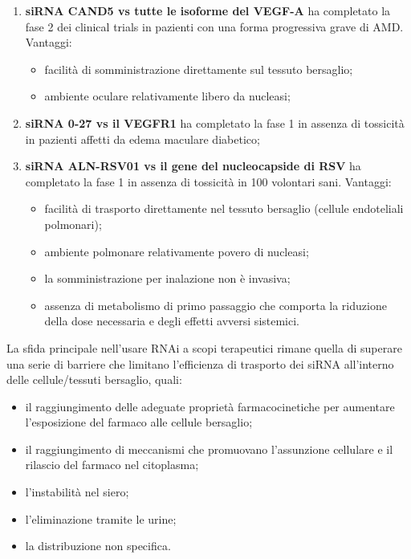 \documentclass[11pt]{book}
\begin{document}
\begin{enumerate}
\def\labelenumi{\arabic{enumi}.}
\item
  \textbf{siRNA CAND5 vs tutte le isoforme del VEGF-A} ha completato la
  fase 2 dei clinical trials in pazienti con una forma progressiva grave
  di AMD. Vantaggi:

  \begin{itemize}
  \itemsep1pt\parskip0pt
  \item
    facilità di somministrazione direttamente sul tessuto bersaglio;
  \item
    ambiente oculare relativamente libero da nucleasi;
  \end{itemize}
\item
  \textbf{siRNA 0-27 vs il VEGFR1} ha completato la fase 1 in assenza di
  tossicità in pazienti affetti da edema maculare diabetico;
\item
  \textbf{siRNA ALN-RSV01 vs il gene del nucleocapside di RSV} ha
  completato la fase 1 in assenza di tossicità in 100 volontari sani.
  Vantaggi:

  \begin{itemize}
  \itemsep1pt\parskip0pt
  \item
    facilità di trasporto direttamente nel tessuto bersaglio (cellule
    endoteliali polmonari);
  \item
    ambiente polmonare relativamente povero di nucleasi;
  \item
    la somministrazione per inalazione non è invasiva;
  \item
    assenza di metabolismo di primo passaggio che comporta la riduzione
    della dose necessaria e degli effetti avversi sistemici.
  \end{itemize}
\end{enumerate}

La sfida principale nell'usare RNAi a scopi terapeutici rimane quella di
superare una serie di barriere che limitano l'efficienza di trasporto
dei siRNA all'interno delle cellule/tessuti bersaglio, quali:

\begin{itemize}
\itemsep1pt\parskip0pt
\item
  il raggiungimento delle adeguate proprietà farmacocinetiche per
  aumentare l'esposizione del farmaco alle cellule bersaglio;
\item
  il raggiungimento di meccanismi che promuovano l'assunzione cellulare
  e il rilascio del farmaco nel citoplasma;
\item
  l'instabilità nel siero;
\item
  l'eliminazione tramite le urine;
\item
  la distribuzione non specifica.
\end{itemize}
\end{document}
